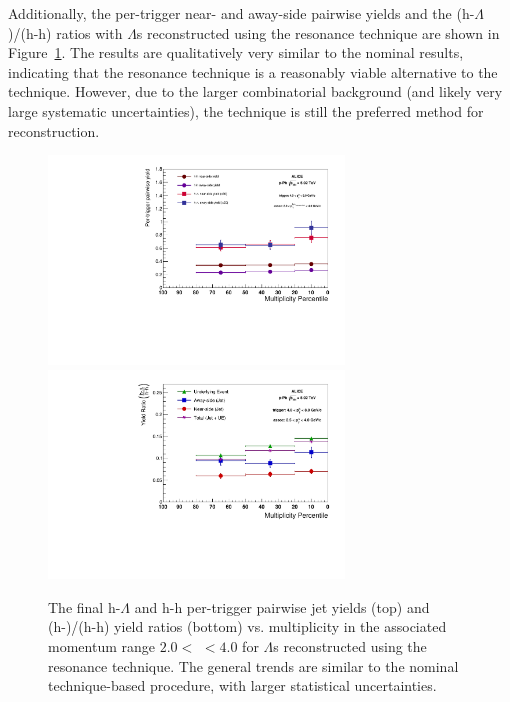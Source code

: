 Additionally, the per-trigger near- and away-side pairwise yields and the (h-$\Lambda$)/(h-h) ratios with $\Lambda$s reconstructed using the resonance technique are shown in Figure~\ref{fig:resonance_final_results}. The results are qualitatively very similar to the nominal results, indicating that the resonance technique is a reasonably viable alternative to the \vz technique. However, due to the larger combinatorial background (and likely very large systematic uncertainties), the \vz technique is still the preferred method for \lmb reconstruction. 


\begin{figure}[ht]
\centering
\includegraphics[width=0.7\textwidth]{figures/analysis/pairwise_plot_resonance.pdf}
\includegraphics[width=0.7\textwidth]{figures/analysis/ratio_plot_resonance.pdf}
\caption{The final h-$\Lambda$ and h-h per-trigger pairwise jet yields (top) and (h-\lmb)/(h-h) yield ratios (bottom) vs. multiplicity in the associated momentum range $2.0 <$ \pt $< 4.0$ \GeVc for $\Lambda$s reconstructed using the resonance technique. The general trends are similar to the nominal \vz technique-based procedure, with larger statistical uncertainties.}
\label{fig:resonance_final_results}
\end{figure}